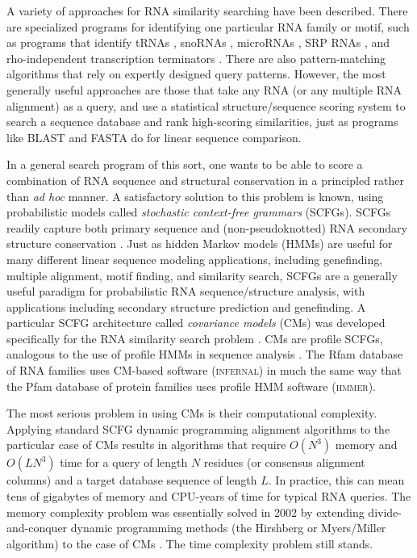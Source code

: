 \documentclass[11pt]{article}
\begin{document}
A variety of approaches for RNA similarity searching have been described. There
are specialized programs for identifying one particular RNA
family or motif, such as programs that identify tRNAs
\cite{LoweEddy97,XXX}, snoRNAs \cite{LoweEddy99}, microRNAs \cite{Lai03,
Lim03}, SRP RNAs \cite{Regalia02}, and rho-independent transcription
terminators \cite{Ermolaeva00}. There are also
pattern-matching algorithms \cite{Macke01,Gautheret01} that rely on
expertly designed query patterns. However, the most generally useful approaches
are those that take any RNA (or any multiple RNA alignment) as a
query, and use a statistical structure/sequence scoring system to
search a sequence database and rank high-scoring similarities, just as
programs like BLAST and FASTA do for linear sequence comparison.

In a general search program of this sort, 
one wants to be able to score a combination of RNA sequence and
structural conservation in a principled rather than \emph{ad hoc}
manner. A satisfactory solution to this problem is known,
using probabilistic models called \emph{stochastic context-free
grammars} (SCFGs). SCFGs readily capture both primary sequence and
(non-pseudoknotted) RNA secondary structure conservation
\cite{Sakakibara94c,Durbin98}. Just as hidden Markov models (HMMs) are
useful for many different linear sequence modeling applications,
including genefinding, multiple alignment, motif finding, and
similarity search, SCFGs are a generally useful paradigm for probabilistic RNA
sequence/structure analysis, with applications including secondary
structure prediction and genefinding. A particular SCFG architecture
called \emph{covariance models} (CMs) was developed specifically for
the RNA similarity search problem \cite{Eddy94}. 
CMs are profile SCFGs, analogous to
the use of profile HMMs in sequence analysis
\cite{Eddy94,Eddy02b}.  The Rfam database of RNA families
\cite{Griffiths-Jones05} uses CM-based software (\textsc{infernal})
in much the same way that the Pfam database of protein
families uses profile HMM software (\textsc{hmmer}).

The most serious problem in using CMs is their computational
complexity. Applying standard SCFG dynamic programming alignment
algorithms to the particular case of CMs results in algorithms that require
$O(N^3)$ memory and
$O(L N^3)$ time for a query of length $N$ residues (or consensus
alignment columns) and a target database sequence of length $L$.  In
practice, this can mean tens of gigabytes of memory and CPU-years of
time for typical RNA queries. The memory complexity problem was
essentially solved in 2002 by extending divide-and-conquer dynamic programming
methods (the Hirshberg or Myers/Miller algorithm) to the case of CMs
\cite{Eddy02b}. The time complexity problem still stands. 
\end{document}
